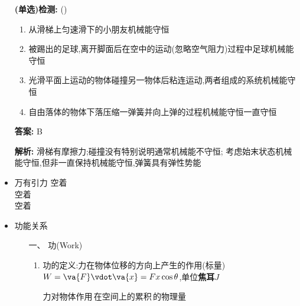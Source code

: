 \documentclass{article}
\begin{document}
\begin{itemize}
          \vspace{1em}

    \item[] \textbf{(单选)检测:} (\qquad)

        \begin{enumerate}[label=\Alph*.]
            \item 从滑梯上匀速滑下的小朋友机械能守恒
            \item 被踢出的足球,离开脚面后在空中的运动(忽略空气阻力)过程中足球机械能守恒
            \item 光滑平面上运动的物体碰撞另一物体后粘连运动,两者组成的系统机械能守恒
            \item 自由落体的物体下落压缩一弹簧并向上弹的过程机械能守恒一直守恒
        \end{enumerate}

        \textbf{答案:} B

        \textbf{解析:} 滑梯有摩擦力;碰撞没有特别说明通常机械能不守恒;
        考虑始末状态机械能守恒,但非一直保持机械能守恒,弹簧具有弹性势能

        \hspace{2em}

    \item 万有引力
          空着    \\
          空着    \\
          空着    \\

          \hspace{2em}

    \item 功能关系
          \begin{enumerate}
              \item[一、] 功(Work)
                  \begin{enumerate}
                      \item 功的定义:力在物体位移的方向上产生的作用(标量)$ W = \va{F} \vdot \va{x} = Fx\cos{\theta}$,单位\textbf{焦耳$J$}

                            \vspace{-1em}

                            \hspace{-1em}\begin{adjustbox}{minipage=0.37\linewidth, bgcolor=gray!20, padding=1em}
                                \small %
                                力对物体作用\,在空间上的累积\,的物理量
                            \end{adjustbox}


\end{enumerate}
\end{enumerate}
\end{itemize}
\end{document}
